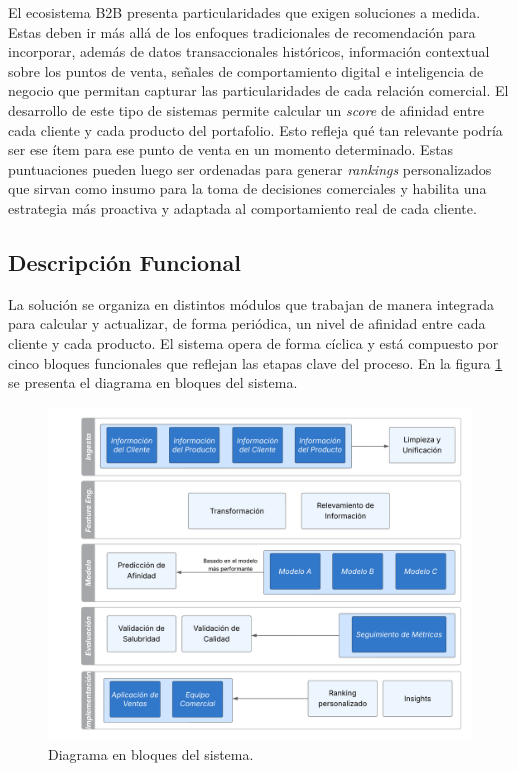 \documentclass[
11pt, %
]{charter}
\begin{document}
El ecosistema B2B presenta particularidades que exigen soluciones a medida. Estas deben ir más allá de los enfoques tradicionales de recomendación para incorporar, además de datos transaccionales históricos, información contextual sobre los puntos de venta, señales de comportamiento digital e inteligencia de negocio que permitan capturar las particularidades de cada relación comercial. El desarrollo de este tipo de sistemas permite calcular un \textit{score} de afinidad entre cada cliente y cada producto del portafolio. Esto refleja qué tan relevante podría ser ese ítem para ese punto de venta en un momento determinado. Estas puntuaciones pueden luego ser ordenadas para generar \textit{rankings} personalizados que sirvan como insumo para la toma de decisiones comerciales y habilita una estrategia más proactiva y adaptada al comportamiento real de cada cliente.

\subsection{Descripción Funcional}

La solución se organiza en distintos módulos que trabajan de manera integrada para calcular y actualizar, de forma periódica, un nivel de afinidad entre cada cliente y cada producto. El sistema opera de forma cíclica y está compuesto por cinco bloques funcionales que reflejan las etapas clave del proceso. En la figura \ref{fig:diagBloques} se presenta el diagrama en bloques del sistema. 

\begin{figure}[htpb]
\centering 
\includegraphics[width=.85\textwidth]{./Figuras/diagBloques.png}
\caption{Diagrama en bloques del sistema.}
\label{fig:diagBloques}
\end{figure}
\end{document}
